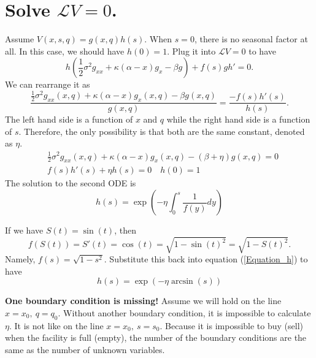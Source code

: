 \documentclass[paper=a4, fontsize=15pt]{scrartcl} %
\numberwithin{equation}{section} %
\numberwithin{figure}{section} %
\numberwithin{table}{section} %
\begin{document}
\newpage

\section{Solve $\mathcal{L}V = 0$.}
Assume $V(x,s,q) = g(x,q)h(s)$. When $s = 0$, there is no seasonal factor at all. In this case, we should have $h(0) = 1$. Plug it into $\mathcal{L} V = 0$ to have
\begin{equation*}
  h\left(\frac{1}{2} \sigma^2 g_{xx} + \kappa (\alpha - x) g_x - \beta g\right) + f(s) g h' = 0.
\end{equation*}
We can rearrange it as
\begin{equation*}
  \frac{\frac{1}{2} \sigma^2 g_{xx}(x,q) + \kappa (\alpha - x) g_x(x,q) - \beta g(x,q)}{g(x,q)} = \frac{-f(s) h'(s)}{h(s)}.
\end{equation*}
The left hand side is a function of $x$ and $q$ while the right hand side is a function of $s$. Therefore, the only possibility is that both are the same constant, denoted as $\eta$.
\begin{equation*}
\begin{split}
  &\frac{1}{2} \sigma^2 g_{xx}(x,q) + \kappa (\alpha - x) g_x(x,q) - (\beta + \eta) g(x,q) = 0\\
  &f(s) h'(s) + \eta h(s) = 0 \quad h(0) = 1
\end{split}
\end{equation*}
The solution to the second ODE is 
\begin{equation}\label{Equation_h}
  h(s) = \exp(-\eta \int_{0}^{s} \frac{1}{f(y)}dy)
\end{equation}

If we have $S(t) = \sin(t)$, then 
\begin{equation*}
	f(S(t)) = S'(t) = \cos(t) =  \sqrt{1-\sin(t)^2}   = \sqrt{1-S(t)^2}.
\end{equation*}
Namely, $f(s) = \sqrt{1-s^2}$. Substitute this back into equation (\ref{Equation_h}) to have
\begin{equation*}
  h(s) = \exp(-\eta \arcsin(s))
\end{equation*}

\textbf{One boundary condition is missing!} Assume we will hold on the line $x = x_0,~q = q_0$. Without another boundary condition, it is impossible to calculate $\eta$. It is not like on the line $x = x_0,~s = s_0$. Because it is impossible to buy (sell) when the facility is full (empty), the number of the boundary conditions are the same as the number of unknown variables.
\end{document}
